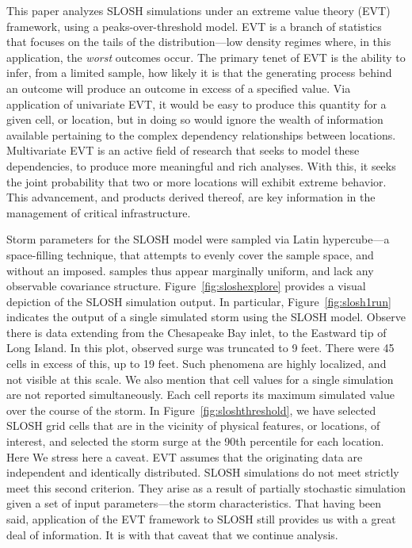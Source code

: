 This paper analyzes SLOSH simulations under an extreme value theory (EVT) framework,
    using a peaks-over-threshold model.  EVT is a branch of statistics that focuses
    on the tails of the distribution---low density regimes where, in this application,
    the \emph{worst} outcomes occur.  The primary tenet of EVT is the ability to infer,
    from a limited sample, how likely it is that the generating process behind an outcome
    will produce an outcome in excess of a specified value. Via application of univariate 
    EVT, it would be easy to produce this quantity for a given cell, or location, but 
    in doing so would ignore the wealth of information available pertaining to the complex 
    dependency relationships between locations.  Multivariate EVT is an active 
    field of research that seeks to model these dependencies, to produce more meaningful
    and rich analyses.  With this, it seeks the joint probability that two or more locations
    will exhibit extreme behavior.  This advancement, and products derived thereof,
    are key information in the management of critical infrastructure.

Storm parameters for the SLOSH model were sampled via Latin hypercube---a space-filling
    technique, that attempts to evenly cover the sample space, and without an imposed.
    samples thus appear marginally uniform, and lack any observable covariance structure.
    Figure~\ref{fig:sloshexplore} provides a visual depiction of the SLOSH simulation 
    output.  In particular, Figure~\ref{fig:slosh1run} indicates the output of a single 
    simulated storm using the SLOSH model.  Observe there is data extending from the 
    Chesapeake Bay inlet, to the Eastward tip of Long Island.  In this plot, observed 
    surge was truncated to 9 feet.  There were 45 cells in excess of this, up to 19 feet.
    Such phenomena are highly localized, and not visible at this scale.  We also mention
    that cell values for a single simulation are not reported simultaneously.  Each cell 
    reports its maximum simulated value over the course of the storm.  In 
    Figure~\ref{fig:sloshthreshold}, we have selected SLOSH grid cells that are in the 
    vicinity of physical features, or locations, of interest, and selected the storm
    surge at the 90th percentile for each location.
    Here We stress here a caveat. EVT assumes that the originating data are independent
    and identically distributed.  SLOSH simulations do not meet strictly meet this 
    second criterion.  They arise as a result of partially stochastic simulation 
    given a set of input parameters---the storm characteristics. That
    having been said, application of the EVT framework to SLOSH still provides us
    with a great deal of information.  It is with that caveat that we continue analysis.
    
